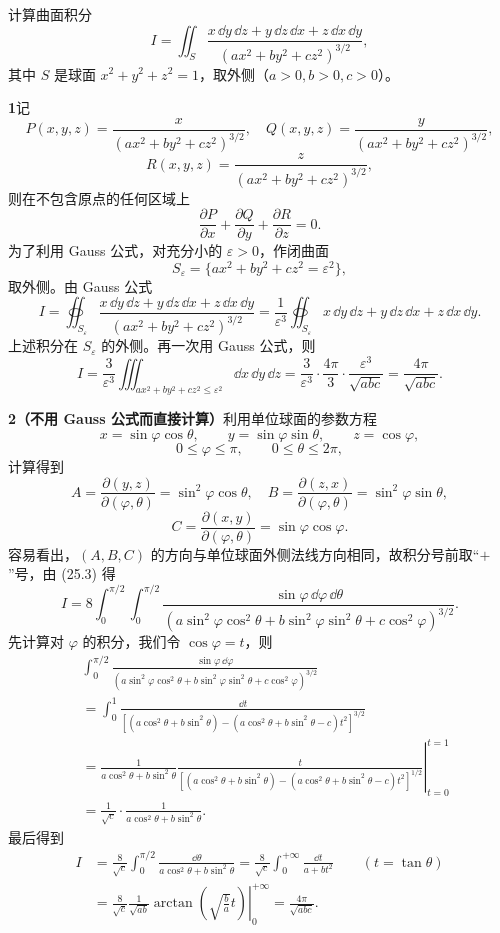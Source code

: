 \begin{xexample}[25.3.2]
计算曲面积分
\[
  I=\iint_S\frac{x\,\dd y\,\dd z+y\,\dd z\,\dd x+z\,\dd x\,\dd y}{(ax^2+by^2+cz^2)^{3/2}},
\]
其中 $S$ 是球面 $x^2+y^2+z^2=1$，取外侧（$a>0,b>0,c>0$）。
\end{xexample}

\begin{xsolution}
\textbf{1}\quad 记
\[
P(x,y,z)=\frac{x}{(ax^2+by^2+cz^2)^{3/2}},\quad
Q(x,y,z)=\frac{y}{(ax^2+by^2+cz^2)^{3/2}},
\]
\[
R(x,y,z)=\frac{z}{(ax^2+by^2+cz^2)^{3/2}},
\]
则在不包含原点的任何区域上
\[
  \frac{\partial P}{\partial x}+\frac{\partial Q}{\partial y}+\frac{\partial R}{\partial z}=0.
\]
为了利用 Gauss 公式，对充分小的 $\varepsilon>0$，作闭曲面
\[
  S_\varepsilon=\{ax^2+by^2+cz^2=\varepsilon^2\},
\]
取外侧。由 Gauss 公式
\[
  I=\oiint_{S_\varepsilon}\frac{x\,\dd y\,\dd z+y\,\dd z\,\dd x+z\,\dd x\,\dd y}{(ax^2+by^2+cz^2)^{3/2}}
  =\frac1{\varepsilon^3}\oiint_{S_\varepsilon}x\,\dd y\,\dd z+y\,\dd z\,\dd x+z\,\dd x\,\dd y.
\]
上述积分在 $S_\varepsilon$ 的外侧。再一次用 Gauss 公式，则
\[
  I=\frac3{\varepsilon^3}\iiint_{ax^2+by^2+cz^2\le\varepsilon^2}\dd x\,\dd y\,\dd z
  =\frac3{\varepsilon^3}\cdot\frac{4\pi}{3}\cdot\frac{\varepsilon^3}{\sqrt{abc}}
  =\frac{4\pi}{\sqrt{abc}}.
\]

\textbf{2（不用 Gauss 公式而直接计算）}\quad 利用单位球面的参数方程
\[
  x=\sin\varphi\cos\theta,\qquad y=\sin\varphi\sin\theta,\qquad z=\cos\varphi,
\]
\[
  0\le\varphi\le\pi,\qquad 0\le\theta\le2\pi,
\]
计算得到
\[
  A=\frac{\partial(y,z)}{\partial(\varphi,\theta)}=\sin^2\varphi\cos\theta,
  \quad B=\frac{\partial(z,x)}{\partial(\varphi,\theta)}=\sin^2\varphi\sin\theta,
\]
\[
  C=\frac{\partial(x,y)}{\partial(\varphi,\theta)}=\sin\varphi\cos\varphi.
\]
容易看出，$(A,B,C)$ 的方向与单位球面外侧法线方向相同，故积分号前取“$+$”号，由 (25.3) 得
\[
  I=8\int_0^{\pi/2}\int_0^{\pi/2}
  \frac{\sin\varphi\,\dd\varphi\,\dd\theta}
  {(a\sin^2\varphi\cos^2\theta+b\sin^2\varphi\sin^2\theta+c\cos^2\varphi)^{3/2}}.
\]
先计算对 $\varphi$ 的积分，我们令 $\cos\varphi=t$，则
\begin{align*}
&\int_0^{\pi/2}\frac{\sin\varphi\,\dd\varphi}
{(a\sin^2\varphi\cos^2\theta+b\sin^2\varphi\sin^2\theta+c\cos^2\varphi)^{3/2}}\\
&=\int_0^1\frac{\dd t}{[(a\cos^2\theta+b\sin^2\theta)-(a\cos^2\theta+b\sin^2\theta-c)t^2]^{3/2}}\\
&=\frac1{a\cos^2\theta+b\sin^2\theta}
\left.\frac{t}{[(a\cos^2\theta+b\sin^2\theta)-(a\cos^2\theta+b\sin^2\theta-c)t^2]^{1/2}}\right|_{t=0}^{t=1}\\
&=\frac1{\sqrt c}\cdot\frac1{a\cos^2\theta+b\sin^2\theta}.
\end{align*}
最后得到
\begin{align*}
I&=\frac8{\sqrt c}\int_0^{\pi/2}\frac{\dd\theta}{a\cos^2\theta+b\sin^2\theta}
=\frac8{\sqrt c}\int_0^{+\infty}\frac{\dd t}{a+bt^2}\qquad(t=\tan\theta)\\
&=\frac8{\sqrt c}\frac1{\sqrt{ab}}
\left.\arctan\left(\sqrt{\frac ba}t\right)\right|_0^{+\infty}
=\frac{4\pi}{\sqrt{abc}}.
\end{align*}
\end{xsolution}

